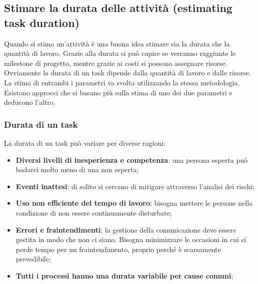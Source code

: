 \subsection{Stimare la durata delle attività (estimating task duration)}
Quando si stima un'attività è una buona idea stimare sia la durata che la quantità di lavoro. Grazie alla durata si può capire se verranno raggiunte le milestone di progetto, mentre grazie ai costi si possono assegnare risorse.
Ovviamente la durata di un task dipende dalla quantità di lavoro e dalle risorse. La stima di entrambi i parametri va svolta utilizzando la stessa metodologia. Esistono approcci che si basano più sulla stima di uno dei due parametri e deducono l'altro.
\subsubsection{Durata di un task}
La durata di un task può variare per diverse ragioni:
\begin{itemize}
	\item \textbf{Diversi livelli di inesperienza e competenza}: una persona esperta può badarci molto meno di una non esperta;
	\item \textbf{Eventi inattesi}: di solito si cercano di mitigare attraverso l'analisi dei rischi;
	\item \textbf{Uso non efficiente del tempo di lavoro}: bisogna mettere le persone nella condizione di non essere continuamente disturbate;
	\item \textbf{Errori e fraintendimenti}: la gestione della comunicazione deve essere gestita in modo che non ci siano. Bisogna minimizzare le occasioni in cui si perde tempo per un fraintendimento, proprio perché è scarsamente prevedibile;
	\item \textbf{Tutti i processi hanno una durata variabile per cause comuni};
\end{itemize}

